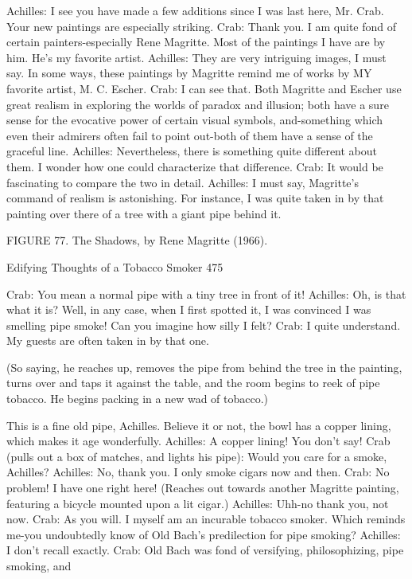 {Achilles: I see you have made a few additions since I was last here, Mr. Crab. Your new
  paintings are especially striking.
Crab: Thank you. I am quite fond of certain painters-especially Rene Magritte. Most of
  the paintings I have are by him. He's my favorite artist.
Achilles: They are very intriguing images, I must say. In some ways, these paintings by
  Magritte remind me of works by MY favorite artist, M. C. Escher.
Crab: I can see that. Both Magritte and Escher use great realism in exploring the worlds
  of paradox and illusion; both have a sure sense for the evocative power of certain
  visual symbols, and-something which even their admirers often fail to point out-both
  of them have a sense of the graceful line.
Achilles: Nevertheless, there is something quite different about them. I wonder how one
  could characterize that difference.
Crab: It would be fascinating to compare the two in detail.
Achilles: I must say, Magritte's command of realism is astonishing. For instance, I was
  quite taken in by that painting over there of a tree with a giant pipe behind it.




                 FIGURE 77. The Shadows, by Rene Magritte (1966).




Edifying Thoughts of a Tobacco Smoker                                               475

Crab: You mean a normal pipe with a tiny tree in front of it!
Achilles: Oh, is that what it is? Well, in any case, when I first spotted it, I was convinced
  I was smelling pipe smoke! Can you imagine how silly I felt?
Crab: I quite understand. My guests are often taken in by that one.

   (So saying, he reaches up, removes the pipe from behind the tree in the painting,
   turns over and taps it against the table, and the room begins to reek of pipe tobacco.
   He begins packing in a new wad of tobacco.)

  This is a fine old pipe, Achilles. Believe it or not, the bowl has a copper lining,
  which makes it age wonderfully.
Achilles: A copper lining! You don't say!
Crab (pulls out a box of matches, and lights his pipe): Would you care for a smoke,
  Achilles?
Achilles: No, thank you. I only smoke cigars now and then.
Crab: No problem! I have one right here! (Reaches out towards another Magritte
  painting, featuring a bicycle mounted upon a lit cigar.)
Achilles: Uhh-no thank you, not now.
Crab: As you will. I myself am an incurable tobacco smoker. Which reminds me-you
  undoubtedly know of Old Bach's predilection for pipe smoking?
Achilles: I don't recall exactly.
Crab: Old Bach was fond of versifying, philosophizing, pipe smoking, and

}
